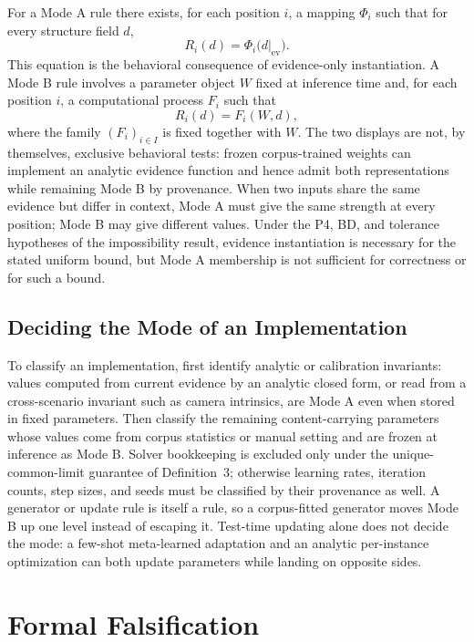 \documentclass[twoside,11pt]{article}
\newcommand{\ev}{\mathrm{ev}}
\begin{document}
For a Mode A rule there exists, for each position $i$, a mapping $\Phi_i$ such that for every structure field $d$,
\begin{equation}
R_i(d) = \Phi_i\bigl(d|_{\ev}\bigr).
\label{eq:modeA}
\end{equation}
This equation is the behavioral consequence of evidence-only instantiation. A Mode B rule involves a parameter object $W$ fixed at inference time and, for each position $i$, a computational process $F_i$ such that
\begin{equation}
R_i(d) = F_i(W, d),
\label{eq:modeB}
\end{equation}
where the family $(F_i)_{i \in I}$ is fixed together with $W$. The two displays are not, by themselves, exclusive behavioral tests: frozen corpus-trained weights can implement an analytic evidence function and hence admit both representations while remaining Mode B by provenance. When two inputs share the same evidence but differ in context, Mode A must give the same strength at every position; Mode B may give different values. Under the P4, BD, and tolerance hypotheses of the impossibility result, evidence instantiation is necessary for the stated uniform bound, but Mode A membership is not sufficient for correctness or for such a bound.

\subsection{Deciding the Mode of an Implementation}
\label{sec:procedure}

To classify an implementation, first identify analytic or calibration invariants: values computed from current evidence by an analytic closed form, or read from a cross-scenario invariant such as camera intrinsics, are Mode A even when stored in fixed parameters. Then classify the remaining content-carrying parameters whose values come from corpus statistics or manual setting and are frozen at inference as Mode B. Solver bookkeeping is excluded only under the unique-common-limit guarantee of Definition~3; otherwise learning rates, iteration counts, step sizes, and seeds must be classified by their provenance as well. A generator or update rule is itself a rule, so a corpus-fitted generator moves Mode B up one level instead of escaping it. Test-time updating alone does not decide the mode: a few-shot meta-learned adaptation and an analytic per-instance optimization can both update parameters while landing on opposite sides.

\section{Formal Falsification}
\label{ch:falsify}
\end{document}
